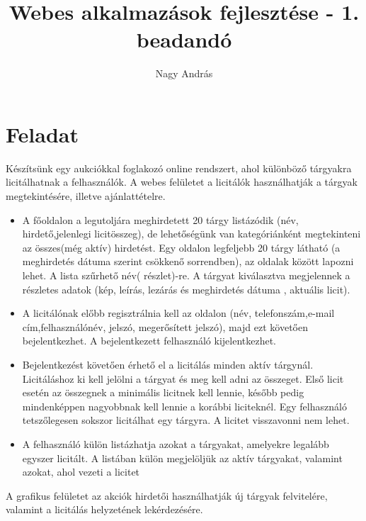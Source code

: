 \documentclass[12pt,a4paper]{article}
\author{Nagy András}
\title{Webes alkalmazások fejlesztése - 1. beadandó}
\begin{document}
\maketitle

\section{Feladat}
Készítsünk egy aukciókkal foglakozó online rendszert, ahol különböző tárgyakra
licitálhatnak a felhasználók.
A  webes  felületet  a  licitálók  használhatják  a 
tárgyak  megtekintésére,  illetve 
ajánlattételre.
\begin{itemize}
\item A  főoldalon  a  legutoljára  meghirdetett  20 tárgy listázódik (név,  hirdető,jelenlegi licitösszeg), de lehetőségünk van kategóriánként megtekinteni az összes(még  aktív)  hirdetést. Egy  oldalon  legfeljebb  20  tárgy  látható  (a 
meghirdetés dátuma szerint csökkenő sorrendben), 
az oldalak között lapozni lehet. A lista szűrhető név(
részlet)-re. A tárgyat kiválasztva megjelennek a 
részletes adatok (kép, leírás, lezárás és meghirdetés 
dátuma , aktuális licit).
\item A licitálónak előbb regisztrálnia kell az oldalon (név, telefonszám,e-mail cím,felhasználónév, jelszó, megerősített jelszó), majd ezt követően bejelentkezhet. A bejelentkezett felhasználó kijelentkezhet.
\item Bejelentkezést  követően érhető  el  a  licitálás  minden  aktív  tárgynál. Licitáláshoz ki 
kell jelölni a tárgyat és meg kell adni az összeget. Első licit esetén az  összegnek a  minimális  licitnek  kell  lennie, később  pedig mindenképpen nagyobbnak kell lennie a korábbi liciteknél. Egy felhasználó tetszőlegesen sokszor licitálhat egy tárgyra. A licitet visszavonni nem lehet.
\item A felhasználó külön listázhatja azokat a tárgyakat, amelyekre legalább egyszer 
licitált. A listában külön megjelöljük az aktív tárgyakat, valamint azokat, ahol 
vezeti a licitet
\end{itemize}

A  grafikus  felületet  az  akciók  hirdetői  használhatják  új  tárgyak  felvitelére, 
valamint a licitálás helyzetének lekérdezésére.
\end{document}
